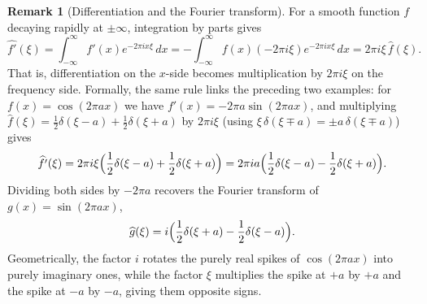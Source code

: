 \documentclass[11pt]{article}
\theoremstyle{plain}
\theoremstyle{definition}
\theoremstyle{boldremark}
\newtheorem*{remark}{Remark}
\theoremstyle{remark}
\numberwithin{equation}{section}
\begin{document}
\begin{remark}[Differentiation and the Fourier transform]
For a smooth function $f$ decaying rapidly at $\pm\infty$, integration by
parts gives
\[
 \widehat{f'}(\xi)
  = \int_{-\infty}^{\infty} f'(x)e^{-2\pi ix\xi}\,dx
  = -\int_{-\infty}^{\infty} f(x)(-2\pi i\xi)e^{-2\pi ix\xi}\,dx
  = 2\pi i\xi\,\widehat{f}(\xi).
\]
That is, differentiation on the $x$-side becomes multiplication by
$2\pi i\xi$ on the frequency side. Formally, the same rule links the
preceding two examples: for $f(x)=\cos(2\pi ax)$ we have
$f'(x)=-2\pi a\sin(2\pi ax)$, and multiplying
$\widehat f(\xi)=\frac{1}{2}\delta(\xi-a)+\frac{1}{2}\delta(\xi+a)$ by
$2\pi i\xi$ (using $\xi\,\delta(\xi\mp a)=\pm a\,\delta(\xi\mp a)$) gives
\[
 \widehat{f'}(\xi)
  = 2\pi i\xi\Bigl(\frac{1}{2}\delta(\xi-a)+\frac{1}{2}\delta(\xi+a)\Bigr)
  = 2\pi ia\Bigl(\frac{1}{2}\delta(\xi-a)-\frac{1}{2}\delta(\xi+a)\Bigr).
\]
Dividing both sides by $-2\pi a$ recovers the Fourier transform of
$g(x)=\sin(2\pi ax)$,
\[
 \widehat{g}(\xi)
  = i\Bigl(\frac{1}{2}\delta(\xi+a)-\frac{1}{2}\delta(\xi-a)\Bigr).
\]
Geometrically, the factor $i$ rotates the purely real spikes of
$\cos(2\pi ax)$ into purely imaginary ones, while the factor $\xi$
multiplies the spike at $+a$ by $+a$ and the spike at $-a$ by $-a$,
giving them opposite signs.
\end{remark}
\end{document}
